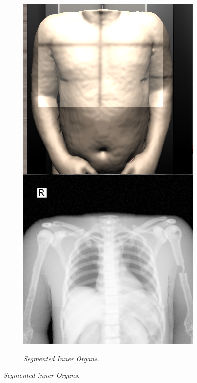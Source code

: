 \begin{figure}[ht]
\begin{subfigure}[b]{0.24\linewidth}
    \end{subfigure}
    \begin{subfigure}[b]{0.24\linewidth}
        \centering
        {\includegraphics[width=\linewidth]{IMG/HVPex.png}}
        \caption{\emph{Segmented Inner Organs}\label{subfig:HVP}.}

\end{subfigure}
\end{figure}
